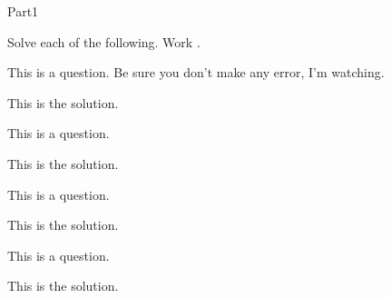 \documentclass[12pt]{article}
\begin{document}
\begin{exam}[Part I.]{Part1}


\begin{problem*}[12]
Solve each of the following. Work \OnBackOfPage.
\begin{multicols}{2}



\begin{parts}
\item This is a question.  Be sure you don't make any error, I'm watching.

\begin{solution}[1in]
This is the solution.
\end{solution}

\item This is a question.
\begin{solution}[\sameVspace]
This is the solution.
\end{solution}

\item This is a question.
\begin{solution}[\sameVspace]
This is the solution.
\end{solution}

\item This is a question.
\begin{solution}[\sameVspace]
This is the solution.
\end{solution}
\end{parts}
\end{multicols}
\end{problem*}

\end{exam}
\end{document}
